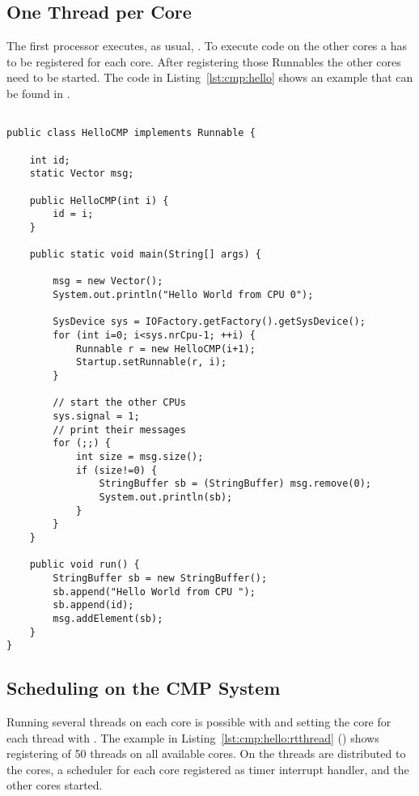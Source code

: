 \subsection{One Thread per Core}

The first processor executes, as usual, . To execute
code on the other cores a  has to be registered for
each core. After registering those Runnables the other cores need to
be started. The code in Listing~\ref{lst:cmp:hello} shows an example
that can be found in .

\begin{lstlisting}[float=t,caption={A CMP version of Hello World},
label=lst:cmp:hello]

public class HelloCMP implements Runnable {

    int id;
    static Vector msg;

    public HelloCMP(int i) {
        id = i;
    }

    public static void main(String[] args) {

        msg = new Vector();
        System.out.println("Hello World from CPU 0");

        SysDevice sys = IOFactory.getFactory().getSysDevice();
        for (int i=0; i<sys.nrCpu-1; ++i) {
            Runnable r = new HelloCMP(i+1);
            Startup.setRunnable(r, i);
        }

        // start the other CPUs
        sys.signal = 1;
        // print their messages
        for (;;) {
            int size = msg.size();
            if (size!=0) {
                StringBuffer sb = (StringBuffer) msg.remove(0);
                System.out.println(sb);
            }
        }
    }

    public void run() {
        StringBuffer sb = new StringBuffer();
        sb.append("Hello World from CPU ");
        sb.append(id);
        msg.addElement(sb);
    }
}
\end{lstlisting}

\subsection{Scheduling on the CMP System}

Running several threads on each core is possible with 
and setting the core for each thread with
. The example in
Listing~\ref{lst:cmp:hello:rtthread}
() shows registering of 50 threads on
all available cores. On  the threads are
distributed to the cores, a scheduler for each core registered as
timer interrupt handler, and the other cores started.

